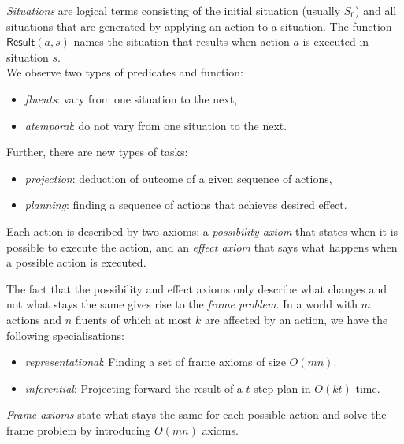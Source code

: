 \documentclass{article}
\begin{document}
\begin{definition}
    \emph{Situations} are logical terms consisting of the initial
    situation (usually $S_0$) and all situations that are generated
    by applying an action to a situation. The function $\textsf{Result}
        (a,s)$ names the situation that results when action $a$ is executed
    in situation $s$.\\
    We observe two types of predicates and function:
    \begin{itemize}
        \item \emph{fluents}: vary from one situation to the next,
        \item \emph{atemporal}: do not vary from one situation to the next.
    \end{itemize}
    Further, there are new types of tasks:
    \begin{itemize}
        \item \emph{projection}: deduction of outcome of a given sequence of actions,
        \item \emph{planning}: finding a sequence of actions that achieves desired effect.
    \end{itemize}
\end{definition}

\begin{definition}
    Each action is described by two axioms: a \emph{possibility axiom}
    that states when it is possible to execute the action, and an
    \emph{effect axiom} that says what happens when a possible action
    is executed.
\end{definition}

\begin{definition}
    The fact that the possibility and effect axioms only describe what changes
    and not what stays the same gives rise to the \emph{frame problem}. In a world
    with $m$ actions and $n$ fluents of which at most $k$ are affected by an action,
    we have the following specialisations:
    \begin{itemize}
        \item \emph{representational}: Finding a set of frame axioms of size $O(mn)$.
        \item \emph{inferential}: Projecting forward the result of a $t$ step plan in $O(kt)$ time.
    \end{itemize}
\end{definition}

\begin{theorem}
    \emph{Frame axioms} state what stays the same for each possible action and
    solve the frame problem by introducing $O(mn)$ axioms.
\end{theorem}
\end{document}
